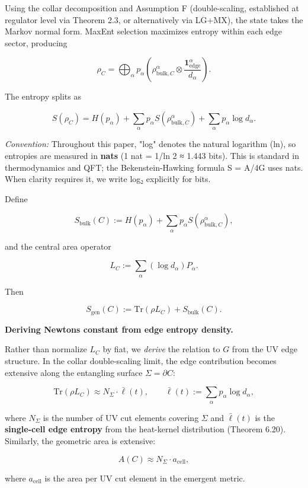 Using the collar decomposition and Assumption F (double-scaling, established at regulator level via Theorem 2.3, or alternatively via LG+MX), the state takes the Markov normal form. MaxEnt selection maximizes entropy within each edge sector, producing

\[
\rho_C = \bigoplus_{\alpha} p_{\alpha}
\left(\rho_{\mathrm{bulk},C}^{\alpha} \otimes \frac{\mathbf 1_{\mathrm{edge}}^{\alpha}}{d_{\alpha}}\right).
\]

The entropy splits as

\[
S(\rho_C) = H(p_{\alpha}) + \sum_{\alpha} p_{\alpha} S(\rho_{\mathrm{bulk},C}^{\alpha}) + \sum_{\alpha} p_{\alpha} \log d_{\alpha}.
\]

\emph{Convention:} Throughout this paper, "log" denotes the natural logarithm (ln), so entropies are measured in \textbf{nats} (1 nat = 1/ln 2 ≈ 1.443 bits). This is standard in thermodynamics and QFT; the Bekenstein-Hawking formula S = A/4G uses nats. When clarity requires it, we write log₂ explicitly for bits.

Define

\[
S_{\mathrm{bulk}}(C) := H(p_{\alpha}) + \sum_{\alpha} p_{\alpha} S(\rho_{\mathrm{bulk},C}^{\alpha}),
\]

and the central area operator

\[
L_C := \sum_{\alpha} (\log d_{\alpha}) P_{\alpha}.
\]

Then

\[
S_{\mathrm{gen}}(C) := \mathrm{Tr}(\rho L_C) + S_{\mathrm{bulk}}(C).
\]

\textbf{Deriving Newton\textquotesingle s constant from edge entropy density.}

Rather than normalize \(L_C\) by fiat, we \emph{derive} the relation to \(G\) from the UV edge structure. In the collar double-scaling limit, the edge contribution becomes extensive along the entangling surface \(\Sigma = \partial C\):

\[
\mathrm{Tr}(\rho L_C) \approx N_\Sigma \cdot \bar{\ell}(t),
\qquad
\bar{\ell}(t) := \sum_\alpha p_\alpha \log d_\alpha,
\]

where \(N_\Sigma\) is the number of UV cut elements covering \(\Sigma\) and \(\bar{\ell}(t)\) is the \textbf{single-cell edge entropy} from the heat-kernel distribution (Theorem 6.20). Similarly, the geometric area is extensive:

\[
A(C) \approx N_\Sigma \cdot a_{\mathrm{cell}},
\]

where \(a_{\mathrm{cell}}\) is the area per UV cut element in the emergent metric.

